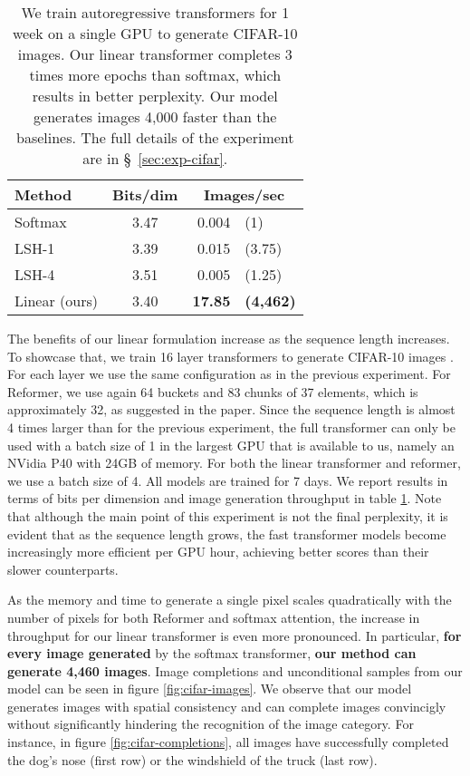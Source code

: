 \documentclass{article}
\begin{document}
\bgroup
\renewcommand{\arraystretch}{1.1}
\begin{table}
    \begin{center}
    \begin{tabular}{lcrl}
        Method & Bits/dim & \multicolumn{2}{c}{Images/sec} \\
        \hline
        Softmax & 3.47 & 0.004 & (1) \\
        LSH-1 & 3.39 & 0.015  & (3.75) \\
        LSH-4 & 3.51 & 0.005  & (1.25) \\
        \hline
        Linear (ours) & 3.40 & \textbf{17.85} & \textbf{(4,462)}
    \end{tabular}
    \end{center}
    \caption{We train autoregressive transformers for 1 week on a single GPU to
             generate CIFAR-10 images. Our linear transformer completes 3 times
             more epochs than softmax, which results in better perplexity. Our model
             generates images 4,000 faster than the baselines. The
             full details of the experiment are in \S~\ref{sec:exp-cifar}.}
    \label{tab:cifar10}
\end{table}
\egroup

The benefits of our linear formulation increase as the sequence length increases.
To showcase that, we train 16 layer transformers to generate
CIFAR-10 images \cite{krizhevsky2009learning}. For each layer we use the same
configuration as in the previous experiment. For Reformer, we use again 64
buckets and 83 chunks of 37 elements, which is approximately 32, as suggested in
the paper. Since the sequence length is almost 4 times larger than for the
previous experiment, the full transformer can only be used with a batch size of 1
in the largest GPU that is available to us, namely an NVidia P40 with 24GB of
memory. For both the linear transformer and reformer, we use a batch size
of 4. All models are trained for 7 days. We report results in terms of
bits per dimension and image generation throughput in table \ref{tab:cifar10}.
Note that although the main point of this experiment is not the final
perplexity, it is evident that as the sequence length grows, the fast
transformer models become increasingly more efficient per GPU hour, achieving
better scores than their slower counterparts.

As the memory and time to generate a single pixel scales quadratically with the
number of pixels for both Reformer and softmax attention, the increase in
throughput for our linear transformer is even more pronounced. In particular,
\textbf{for every image generated} by the softmax transformer, \textbf{our
method can generate 4,460 images}. Image completions and unconditional samples
from our model can be seen in figure \ref{fig:cifar-images}. We observe that
our model generates images with spatial consistency and can complete images
convincigly without significantly hindering the recognition of the image
category. For instance, in figure \ref{fig:cifar-completions}, all images have
successfully completed the dog's nose (first row) or the windshield of the
truck (last row).
\end{document}
